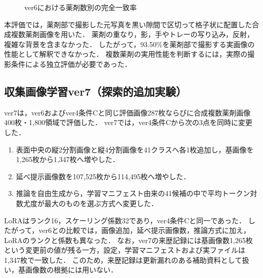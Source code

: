 \documentclass[uplatex,dvipdfmx]{jsarticle}
\begin{document}
\begin{figure}[H]
  \centering
  \caption{ver6における薬剤数別の完全一致率}
  \label{fig:multi_count}
\end{figure}

本評価では，薬剤部で撮影した元写真を黒い隙間で区切って格子状に配置した合成複数薬剤画像を用いた．
薬剤の重なり，影，手やトレーの写り込み，反射，複雑な背景を含まなかった．
したがって，93.50\%を薬剤部で撮影する実画像の性能として解釈できなかった．
複数薬剤の実用性能を判断するには，実際の撮影条件による独立評価が必要であった．

\subsection{収集画像学習ver7（探索的追加実験）}\label{sec:ver7_results}

ver7は，ver6およびver4条件Cと同じ評価画像287枚ならびに合成複数薬剤画像400枚・1,800領域で評価した．
ver7では，ver4条件Cから次の3点を同時に変更した．
\begin{enumerate}
  \item 表面中央の縦2分割画像と縦4分割画像を41クラスへ各1枚追加し，基画像を1,265枚から1,347枚へ増やした．
  \item 延べ提示画像数を107,525枚から114,495枚へ増やした．
  \item 推論を自由生成から，学習マニフェスト由来の41候補の中で平均トークン対数尤度が最大のものを選ぶ方式へ変更した．
\end{enumerate}
LoRAはランク16，スケーリング係数32であり，ver4条件Cと同一であった．
したがって，ver6との比較では，画像追加，延べ提示画像数，推論方式に加え，LoRAのランクと係数も異なった．
なお，ver7の来歴記録には基画像数1,265枚という変更前の値が残る一方，設定，学習マニフェストおよび実ファイルは1,347枚で一致した．
このため，来歴記録は更新漏れのある補助資料として扱い，基画像数の根拠には用いない．
\end{document}
